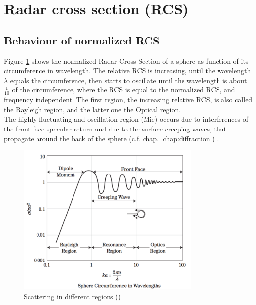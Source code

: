 \section{Radar cross section (RCS)}

\subsection{Behaviour of normalized RCS}
Figure \ref{fig:RCS} shows the normalized Radar Cross Section of a sphere as function of its circumference in wavelength. The relative RCS is increasing, until the wavelength $\lambda$ equals the circumference, then starts to oscillate until the wavelength is about $\frac{1}{10}$ of the circumference, where the RCS is equal to the normalized RCS, and frequency independent. The first region, the increasing relative RCS, is also called the Rayleigh region, and the latter one the Optical region.\\
The highly fluctuating and oscillation region (Mie) occurs due to interferences of the front face specular return and due to the surface creeping waves, that propagate around the back of the sphere (c.f. chap. \ref{chap:diffraction}) \citep{richards2010principles}.

\begin{figure}[h!]
	\centering
	\includegraphics[width=0.8\textwidth]{images/nRCS}
	\caption{Scattering in different regions	 (\citep[c.f.][Fig. 6-12]{richards2010principles})}
	\label{fig:RCS}
\end{figure}

